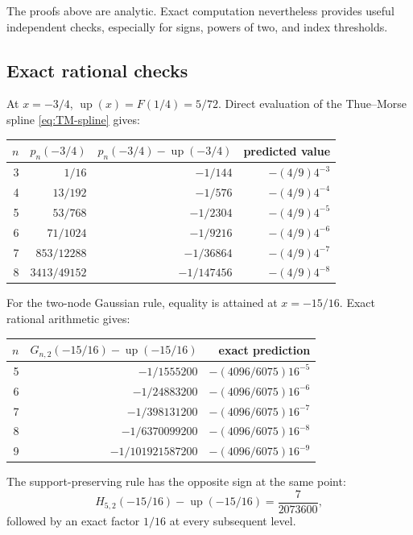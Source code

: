 \documentclass[11pt]{article}
\numberwithin{equation}{section}
\theoremstyle{definition}
\theoremstyle{remark}
\newcommand{\Up}{\operatorname{up}}
\begin{document}
The proofs above are analytic.  Exact computation nevertheless provides useful independent checks, especially for signs, powers of two, and index thresholds.

\subsection{Exact rational checks}

At $x=-3/4$, $\Up(x)=F(1/4)=5/72$.  Direct evaluation of the Thue--Morse spline \eqref{eq:TM-spline} gives:

\begin{center}
\begin{tabular}{@{}rrrr@{}}
\toprule
$n$ & $p_n(-3/4)$ & $p_n(-3/4)-\Up(-3/4)$ & predicted value\\
\midrule
3 & $1/16$ & $-1/144$ & $-(4/9)4^{-3}$\\
4 & $13/192$ & $-1/576$ & $-(4/9)4^{-4}$\\
5 & $53/768$ & $-1/2304$ & $-(4/9)4^{-5}$\\
6 & $71/1024$ & $-1/9216$ & $-(4/9)4^{-6}$\\
7 & $853/12288$ & $-1/36864$ & $-(4/9)4^{-7}$\\
8 & $3413/49152$ & $-1/147456$ & $-(4/9)4^{-8}$\\
\bottomrule
\end{tabular}
\end{center}

For the two-node Gaussian rule, equality is attained at $x=-15/16$.  Exact rational arithmetic gives:

\begin{center}
\begin{tabular}{@{}rrr@{}}
\toprule
$n$ & $G_{n,2}(-15/16)-\Up(-15/16)$ & exact prediction\\
\midrule
5 & $-1/1555200$ & $-(4096/6075)16^{-5}$\\
6 & $-1/24883200$ & $-(4096/6075)16^{-6}$\\
7 & $-1/398131200$ & $-(4096/6075)16^{-7}$\\
8 & $-1/6370099200$ & $-(4096/6075)16^{-8}$\\
9 & $-1/101921587200$ & $-(4096/6075)16^{-9}$\\
\bottomrule
\end{tabular}
\end{center}

The support-preserving rule has the opposite sign at the same point:
\begin{equation}
 H_{5,2}(-15/16)-\Up(-15/16)=\frac7{2073600},
 \label{eq:H52-check}
\end{equation}
followed by an exact factor $1/16$ at every subsequent level.
\end{document}
